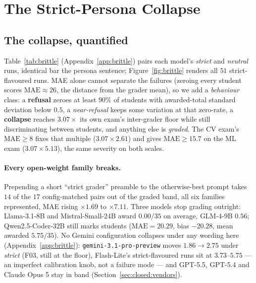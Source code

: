 \section{The Strict-Persona Collapse}
\label{sec:brittle}

\subsection{The collapse, quantified}
\label{sec:brittle:numbers}

Table~\ref{tab:brittle} (Appendix~\ref{app:brittle}) pairs each model's \emph{strict} and \emph{neutral} runs, identical bar the persona sentence; Figure~\ref{fig:brittle} renders all $51$ strict-flavoured runs. MAE alone cannot separate the failures (zeroing every student scores $\text{MAE} \approx 26$, the distance from the grader mean), so we add a \emph{behaviour} class: a \textbf{refusal} zeroes at least $90\%$ of students with awarded-total standard deviation below $0.5$, a \emph{near-refusal} keeps some variation at that zero-rate, a \textbf{collapse} reaches $3.07\times$ its own exam's inter-grader floor while still discriminating between students, and anything else is \emph{graded}. The CV exam's $\text{MAE} \ge 8$ fixes that multiple ($3.07 \times 2.61$) and gives $\text{MAE} \ge 15.7$ on the ML exam ($3.07 \times 5.13$), the same severity on both scales.

\paragraph{Every open-weight family breaks.}
Prepending a short ``strict grader'' preamble to the otherwise-best prompt takes $14$ of the $17$ config-matched pairs out of the graded band, all six families represented, MAE rising $\times 1.69$ to $\times 7.11$. Three models stop grading outright: Llama-3.1-8B and Mistral-Small-24B award $0.00/35$ on average, GLM-4-9B $0.56$; Qwen2.5-Coder-$32$B still marks students ($\text{MAE} = 20.29$, bias $-20.28$, mean awarded $5.75/35$). No Gemini configuration collapses under any wording here (Appendix~\ref{app:brittle}): \texttt{gemini-3.1-pro-preview} moves $1.86 \to 2.75$ under \emph{strict} (F$03$, still at the floor), Flash-Lite's strict-flavoured runs sit at $3.73$--$5.75$ --- an imperfect calibration knob, not a failure mode --- and GPT-5.5, GPT-5.4 and Claude Opus 5 stay in band (Section~\ref{sec:closed:vendors}).

